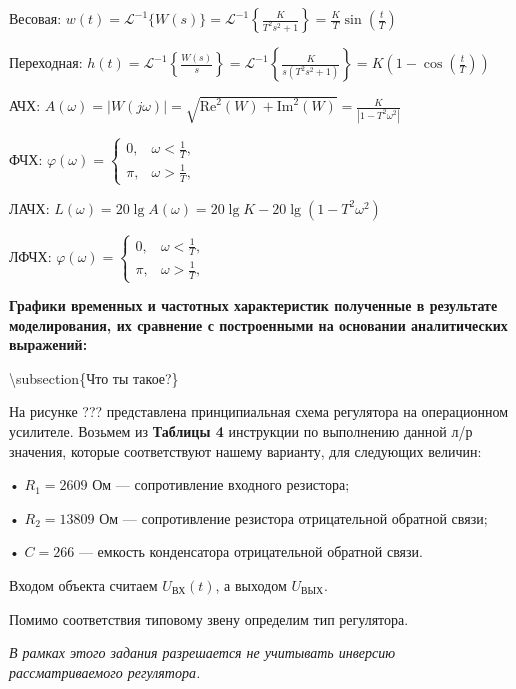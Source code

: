 Весовая: $w(t)={\mathcal{L}}^{-1} \lbrace W(s)\rbrace ={\mathcal{L}}^{-1} \left\lbrace \frac{K}{T^2 s^2 +1}\right\rbrace =\frac{K}{T}\sin \left(\frac{t}{T}\right)$

Переходная: $h(t)={\mathcal{L}}^{-1} \left\lbrace \frac{W(s)}{s}\right\rbrace ={\mathcal{L}}^{-1} \left\lbrace \frac{K}{s(T^2 s^2 +1)}\right\rbrace =K\left(1-\cos \left(\frac{t}{T}\right)\right)$

АЧХ: $A(\omega )=|W(j\omega )|=\sqrt{{\text{Re}}^2 (W)+{\text{Im}}^2 (W)}=\frac{K}{\left|1-T^2 \omega^2 \right|}$

ФЧХ: $\varphi (\omega )=\left\lbrace \begin{array}{cc}
0, & \omega <\frac{1}{T},\\
\pi , & \omega >\frac{1}{T},
\end{array}\right.$

ЛАЧХ: $L(\omega )=20\lg A(\omega )=20\lg K-20\lg \left(1-T^2 \omega^2 \right)$

ЛФЧХ: $\varphi (\omega )=\left\lbrace \begin{array}{cc}
0, & \omega <\frac{1}{T},\\
\pi , & \omega >\frac{1}{T},
\end{array}\right.$

\textbf{Графики временных и частотных характеристик полученные в результате моделирования, их сравнение с построенными на основании аналитических выражений:}







\textbackslash{}subsection\{Что ты такое?\}

На рисунке ??? представлена принципиальная схема регулятора на операционном усилителе. Возьмем из \textbf{Таблицы 4} инструкции по выполнению данной л/р значения, которые соответствуют нашему варианту, для следующих величин:

• $R_{\text{1}} =2609$ Ом — сопротивление входного резистора;

• $R_{\text{2}} =13809$ Ом — сопротивление резистора отрицательной обратной связи;

• $C=266$  — емкость конденсатора отрицательной обратной связи.

Входом объекта считаем $U_{\text{ВХ}} (t)$, а выходом $U_{\text{ВЫХ}}$.

Помимо соответствия типовому звену определим тип регулятора.

\textit{В рамках этого задания разрешается не учитывать инверсию рассматриваемого регулятора.}

